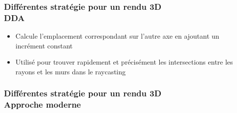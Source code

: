 \documentclass{beamer}
\begin{document}
\begin{frame}
    \frametitle{Différentes stratégie pour un rendu 3D \\
                \small DDA}           
    \begin{block}{}
        \begin{itemize}
            \item Calcule l'emplacement correspondant sur l'autre axe en ajoutant un incrément constant
            \item Utilisé pour trouver rapidement et précisément les intersections entre les rayons 
            et les murs dans le raycasting
        \end{itemize}
    \end{block}    
\end{frame}

\begin{frame}
    \frametitle{Différentes stratégie pour un rendu 3D \\
                \small Approche moderne}           
    \begin{block}{}
        
    \end{block}    
\end{frame}
\end{document}
